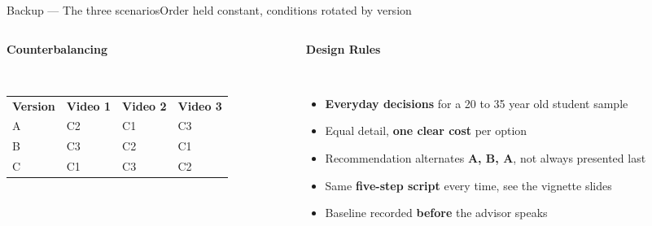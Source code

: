 \documentclass[aspectratio=169,10pt]{beamer}
\newcommand{\hl}[1]{{\color{knblue}\textbf{#1}}}
\newcommand{\panelheadsm}[1]{\noindent\colorbox{kncyan}{\parbox{0.96\textwidth}{\centering\vspace{1pt}\color{white}\tiny\bfseries #1\vspace{1pt}}}\\[0.2em]}
\begin{document}
\begin{frame}{Backup — The three scenarios}{Order held constant, conditions rotated by version}
  \begin{columns}[T]
    \begin{column}{0.52\textwidth}
      \panelheadsm{Counterbalancing}
      \noindent\colorbox{knlight}{\parbox{0.96\textwidth}{\vspace{2pt}\scriptsize
      \setlength{\tabcolsep}{4pt}\renewcommand{\arraystretch}{1.25}
      \begin{tabular}{@{}llll@{}}
        \textbf{Version} & \textbf{Video 1} & \textbf{Video 2} & \textbf{Video 3} \\
        A & C2 & C1 & C3 \\
        B & C3 & C2 & C1 \\
        C & C1 & C3 & C2 \\
      \end{tabular}\vspace{2pt}}}
    \end{column}
    \begin{column}{0.44\textwidth}
      \panelheadsm{Design Rules}
      \noindent\colorbox{knlight}{\parbox{0.96\textwidth}{\vspace{2pt}\scriptsize
      \begin{itemize}\setlength{\itemsep}{0.1em}\setlength{\leftmargini}{1.0em}
        \item \hl{Everyday decisions} for a 20 to 35 year old student sample
        \item Equal detail, \hl{one clear cost} per option
        \item Recommendation alternates \hl{A, B, A}, not always presented last
        \item Same \hl{five-step script} every time, see the vignette slides
        \item Baseline recorded \hl{before} the advisor speaks
      \end{itemize}\vspace{2pt}}}
    \end{column}
  \end{columns}
\end{frame}
\end{document}
